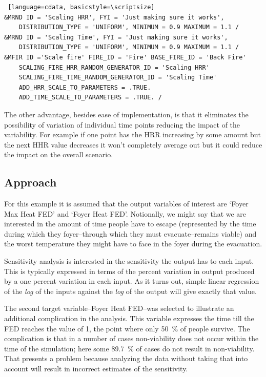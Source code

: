 \documentclass[12pt,twoside]{book}
\begin{document}
\vspace{\baselineskip}
\begin{lstlisting} [language=cdata, basicstyle=\scriptsize]
&MRND ID = 'Scaling HRR', FYI = 'Just making sure it works',
    DISTRIBUTION_TYPE = 'UNIFORM', MINIMUM = 0.9 MAXIMUM = 1.1 /
&MRND ID = 'Scaling Time', FYI = 'Just making sure it works',
    DISTRIBUTION_TYPE = 'UNIFORM', MINIMUM = 0.9 MAXIMUM = 1.1 /
&MFIR ID ='Scale fire' FIRE_ID = 'Fire' BASE_FIRE_ID = 'Back Fire'
    SCALING_FIRE_HRR_RANDOM_GENERATOR_ID = 'Scaling HRR'
    SCALING_FIRE_TIME_RANDOM_GENERATOR_ID = 'Scaling Time'
    ADD_HRR_SCALE_TO_PARAMETERS = .TRUE.
    ADD_TIME_SCALE_TO_PARAMETERS = .TRUE. /
\end{lstlisting}

The other advantage, besides ease of implementation, is that it eliminates the possibility of variation of individual time points reducing the impact of the variability. For example if one point has the HRR increasing by some amount but the next HHR value decreases it won't completely average out but it could reduce the impact on the overall scenario.

\hypertarget{approach}{%
\subsection{Approach}\label{approach}}

For this example it is assumed that the output variables of interest are `Foyer Max Heat FED' and `Foyer Heat FED'. Notionally, we might say that we are interested in the amount of time people have to escape (represented by the time during which they foyer--through which they must evacuate--remains viable) and the worst temperature they might have to face in the foyer during the evacuation.

Sensitivity analysis is interested in the sensitivity the output has to each input. This is typically expressed in terms of the percent variation in output produced by a one percent variation in each input. As it turns out, simple linear regression of the \emph{log} of the inputs against the \emph{log} of the output will give exactly that value.

The second target variable--Foyer Heat FED--was selected to illustrate an additional complication in the analysis. This variable expresses the time till the FED reaches the value of 1, the point where only 50~\% of people survive. The complication is that in a number of cases non-viability does not occur within the time of the simulation; here some 89.7~\% of cases do not result in non-viability. That presents a problem because analyzing the data without taking that into account will result in incorrect estimates of the sensitivity.
\end{document}
